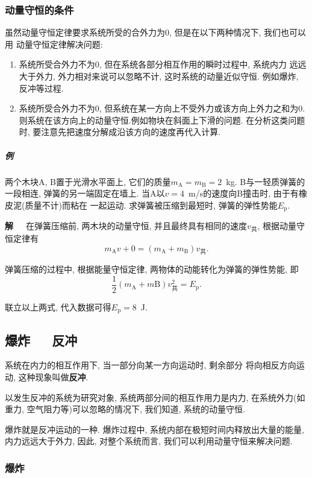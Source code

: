 \documentclass[12pt,a4paper]{ctexart}
\newcounter{exam}[section]
\newcommand{\bre}{\ \ \ }
\begin{document}
\subsubsection*{动量守恒的条件}

虽然动量守恒定律要求系统所受的合外力为0, 但是在以下两种情况下, 我们也可以用
动量守恒定律解决问题:
\begin{enumerate}
    \item 系统所受合外力不为0, 但在系统各部分相互作用的瞬时过程中, 系统内力
          远远大于外力, 外力相对来说可以忽略不计, 这时系统的动量近似守恒. 例如爆炸, 反冲等过程.
    \item 系统所受合外力不为0, 但系统在某一方向上不受外力或该方向上外力之和为0.
          则系统在该方向上的动量守恒.例如物块在斜面上下滑的问题. 在分析这类问题时, 要注意先把速度分解成沿该方向的速度再代入计算.
\end{enumerate}

\subparagraph{例\theexam} 两个木块A, B置于光滑水平面上, 它们的质量$m_\mathrm{A} = m_\mathrm{B} = 2$\ kg.
B与一轻质弹簧的一段相连,
弹簧的另一端固定在墙上. 当A以$v = 4$\ m/s的速度向B撞击时, 由于有橡皮泥(质量不计)而粘在
一起运动. 求弹簧被压缩到最短时, 弹簧的弹性势能$E_\mathrm{p}$.

\textbf{解}\bre 在弹簧压缩前, 两木块的动量守恒, 并且最终具有相同的速度$v_\text{共}$,
根据动量守恒定律有$$m_\mathrm{A}v + 0 = (m_\mathrm{A}+m_\mathrm{B})v_\text{共}.$$

弹簧压缩的过程中, 根据能量守恒定律, 两物体的动能转化为弹簧的弹性势能, 即
$$\frac12 (m_\mathrm{A}+m\mathrm{B}) v_\text{共}^2 = E_\mathrm{p}.$$

联立以上两式, 代入数据可得$E_\mathrm{p} = 8$\ J.

\subsection{爆炸\ \ \ 反冲}
系统在内力的相互作用下, 当一部分向某一方向运动时, 剩余部分
将向相反方向运动, 这种现象叫做\textbf{反冲}.

以发生反冲的系统为研究对象, 系统两部分间的相互作用力是内力,
在系统外力(如重力, 空气阻力等)可以忽略的情况下, 我们知道,
系统的动量守恒.

爆炸就是反冲运动的一种. 爆炸过程中,
系统内部在极短时间内释放出大量的能量, 内力远远大于外力,
因此, 对整个系统而言, 我们可以利用动量守恒来解决问题.

\subsubsection{爆炸}
\end{document}
